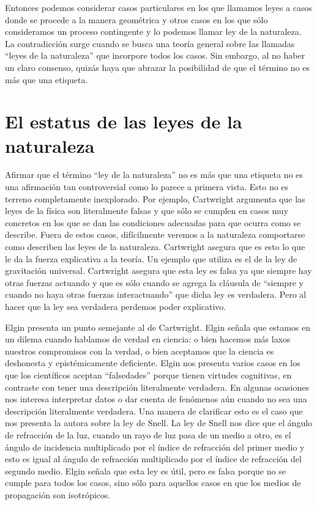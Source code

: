 Entonces podemos considerar casos particulares en los que llamamos leyes a casos donde se procede a la manera geométrica y otros casos en los que sólo consideramos un proceso contingente y lo podemos llamar ley de la naturaleza. La contradicción surge cuando se busca una teoría general sobre las llamadas ``leyes de la naturaleza'' que incorpore todos los casos. Sin embargo, al no haber un claro consenso, quizás haya que abrazar la posibilidad de que el término no es más que una etiqueta.

\section{El estatus de las leyes de la naturaleza}

\noindent Afirmar que el término ``ley de la naturaleza'' no es más que una etiqueta no es una afirmación tan controversial como lo parece a primera vista. Esto no es terreno completamente inexplorado. Por ejemplo, Cartwright \citeyear{Cartwright1983} argumenta que las leyes de la física son literalmente falsas y que sólo se cumplen en casos muy concretos en los que se dan las condiciones adecuadas para que ocurra como se describe. Fuera de estos casos, difícilmente veremos a la naturaleza comportarse como describen las leyes de la naturaleza. Cartwright asegura que es esto lo que le da la fuerza explicativa a la teoría. Un ejemplo que utiliza es el de la ley de gravitación universal. Cartwright asegura que esta ley es falsa ya que siempre hay otras fuerzas actuando y que es sólo cuando se agrega la cláusula de ``siempre y cuando no haya otras fuerzas interactuando'' que dicha ley es verdadera. Pero al hacer que la ley sea verdadera perdemos poder explicativo.

Elgin presenta un punto semejante al de Cartwright. Elgin \citeyear{Elgin2004} señala que estamos en un dilema cuando hablamos de verdad en ciencia: o bien hacemos más laxos nuestros compromisos con la verdad, o bien aceptamos que la ciencia es deshonesta y epistémicamente deficiente. Elgin nos presenta varios casos en los que los científicos aceptan ``falsedades'' porque tienen virtudes cognitivas, en contraste con tener una descripción literalmente verdadera. En algunas ocasiones nos interesa interpretar datos o dar cuenta de fenómenos aún cuando no sea una descripción literalmente verdadera. Una manera de clarificar esto es el caso que nos presenta la autora sobre la ley de Snell. La ley de Snell nos dice que el ángulo de refracción de la luz, cuando un rayo de luz pasa de un medio a otro, es el ángulo de incidencia multiplicado por el índice de refracción del primer medio y esto es igual al ángulo de refracción multiplicado por el índice de refracción del segundo medio. Elgin señala que esta ley es útil, pero es falsa porque no se cumple para todos los casos, sino sólo para aquellos casos en que los medios de propagación son isotrópicos.

